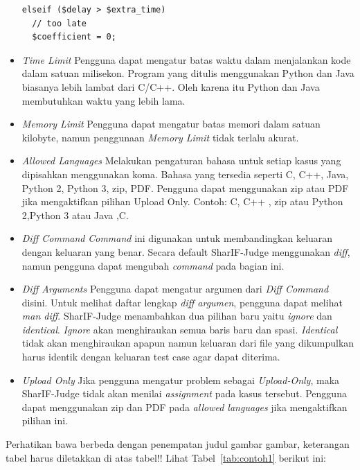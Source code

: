 \begin{itemize}
\begin{verbatim}
elseif ($delay > $extra_time)
  // too late
  $coefficient = 0;
        \end{verbatim}
    \item \textit{Time Limit} \newline
    Pengguna dapat mengatur batas waktu dalam menjalankan kode dalam satuan milisekon. Program yang ditulis menggunakan Python dan Java biasanya lebih lambat dari C/C++. Oleh karena itu Python dan Java membutuhkan waktu yang lebih lama. \\
    \item \textit{Memory Limit} \newline
    Pengguna dapat mengatur batas memori dalam satuan kilobyte, namun penggunaan \textit{Memory Limit} tidak terlalu akurat.\\
    \item \textit{Allowed Languages} \newline
    Melakukan pengaturan bahasa untuk setiap kasus yang dipisahkan menggunakan koma. Bahasa yang tersedia seperti C, C++, Java, Python 2, Python 3, zip, PDF. Pengguna dapat menggunakan zip atau PDF jika mengaktifkan pilihan Upload Only. Contoh: C, C++ , zip atau Python 2,Python 3 atau Java ,C. \\
    \item \textit{Diff Command} \newline
    \textit{Command} ini digunakan untuk membandingkan keluaran dengan keluaran yang benar. Secara default SharIF-Judge menggunakan \textit{diff}, namun pengguna dapat mengubah \textit{command} pada bagian ini. \\
    \item \textit{Diff Arguments} \newline
    Pengguna dapat mengatur argumen dari \textit{Diff Command} disini. Untuk melihat daftar lengkap \textit{diff argumen}, pengguna dapat melihat \textit{man diff}. SharIF-Judge menambahkan dua pilihan baru yaitu \textit{ignore} dan \textit{identical}. \textit{Ignore} akan menghiraukan semua baris baru dan spasi. \textit{Identical} tidak akan menghiraukan apapun namun keluaran dari file yang dikumpulkan harus identik dengan keluaran test case agar dapat diterima. \\
    \item \textit{Upload Only} \newline
    Jika pengguna mengatur problem sebagai \textit{Upload-Only}, maka SharIF-Judge tidak akan menilai \textit{assignment} pada kasus tersebut. Pengguna dapat menggunakan zip dan PDF pada \textit{allowed languages} jika mengaktifkan pilihan ini.
\end{itemize}
\newpage
Perhatikan bawa berbeda dengan penempatan judul gambar gambar, keterangan tabel harus diletakkan di atas tabel!!
Lihat Tabel~\ref{tab:contoh1} berikut ini:

